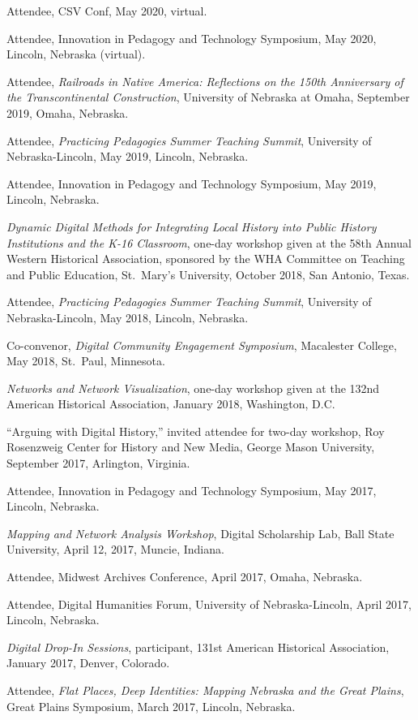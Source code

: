 Attendee, CSV Conf, May 2020, virtual.

Attendee, Innovation in Pedagogy and Technology Symposium, May 2020,
Lincoln, Nebraska (virtual).

Attendee, \emph{Railroads in Native America: Reflections on the 150th
Anniversary of the Transcontinental Construction}, University of
Nebraska at Omaha, September 2019, Omaha, Nebraska.

Attendee, \emph{Practicing Pedagogies Summer Teaching Summit},
University of Nebraska-Lincoln, May 2019, Lincoln, Nebraska.

Attendee, Innovation in Pedagogy and Technology Symposium, May 2019,
Lincoln, Nebraska.

\emph{Dynamic Digital Methods for Integrating Local History into Public
History Institutions and the K-16 Classroom}, one-day workshop given at
the 58th Annual Western Historical Association, sponsored by the WHA
Committee on Teaching and Public Education, St.~Mary's University,
October 2018, San Antonio, Texas.

Attendee, \emph{Practicing Pedagogies Summer Teaching Summit},
University of Nebraska-Lincoln, May 2018, Lincoln, Nebraska.

Co-convenor, \emph{Digital Community Engagement Symposium}, Macalester
College, May 2018, St.~Paul, Minnesota.

\emph{Networks and Network Visualization}, one-day workshop given at the
132nd American Historical Association, January 2018, Washington, D.C.

``Arguing with Digital History,'' invited attendee for two-day workshop,
Roy Rosenzweig Center for History and New Media, George Mason
University, September 2017, Arlington, Virginia.

Attendee, Innovation in Pedagogy and Technology Symposium, May 2017,
Lincoln, Nebraska.

\emph{Mapping and Network Analysis Workshop}, Digital Scholarship Lab,
Ball State University, April 12, 2017, Muncie, Indiana.

Attendee, Midwest Archives Conference, April 2017, Omaha, Nebraska.

Attendee, Digital Humanities Forum, University of Nebraska-Lincoln,
April 2017, Lincoln, Nebraska.

\emph{Digital Drop-In Sessions}, participant, 131st American Historical
Association, January 2017, Denver, Colorado.

Attendee, \emph{Flat Places, Deep Identities: Mapping Nebraska and the
Great Plains}, Great Plains Symposium, March 2017, Lincoln, Nebraska.

